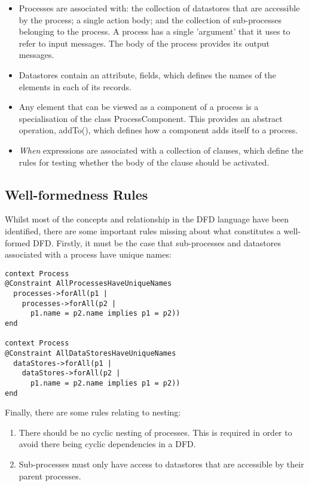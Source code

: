 \begin{itemize}
\item Processes are associated with: the collection of datastores that are accessible by the process; a single action body; and the collection of sub-processes belonging to the process. A process has a single 'argument' that it uses to refer to input messages. The body of the process provides its output messages.
\item Datastores contain an attribute, fields, which defines the names of the elements in each of its records.
\item Any element that can be viewed as a component of a process is a specialisation of the class ProcessComponent. This provides an abstract operation, addTo(), which defines how a component adds itself to a process.
\item {\it When} expressions are associated with a collection of clauses, which define the rules for testing whether the body of the clause should be activated.
\end{itemize}

\subsection{Well-formedness Rules}

Whilst most of the concepts and relationship in the DFD language have been identified,  there are some important rules missing about what constitutes a well-formed DFD. Firstly, it must be the case that sub-processes and datastores associated with a process have unique names:

\small
\begin{verbatim}
context Process
@Constraint AllProcessesHaveUniqueNames
  processes->forAll(p1 |
    processes->forAll(p2 |
      p1.name = p2.name implies p1 = p2))
end

context Process
@Constraint AllDataStoresHaveUniqueNames
  dataStores->forAll(p1 |
    dataStores->forAll(p2 |
      p1.name = p2.name implies p1 = p2))
end
\end{verbatim}
\normalsize

Finally, there are some rules relating to nesting:

\begin{enumerate}
\item There should be no cyclic nesting of processes. This is required in order to avoid there being cyclic dependencies in a DFD.
\item Sub-processes must only have access to datastores that are accessible by their parent processes.
\end{enumerate}

